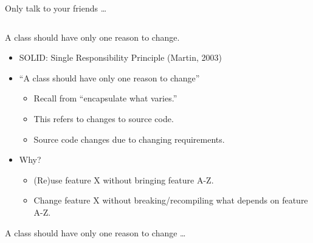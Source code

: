 \documentclass{beamer}
\begin{document}
\begin{frame}{Only talk to your friends \ldots}
    \vspace{0cm}
    \begin{columns}
        \column{\dimexpr\paperwidth-40pt}
        
    \end{columns}
\end{frame}

\begin{frame}{A class should have only one reason to change.}
    \begin{itemize}
        \item SOLID: Single Responsibility Principle (Martin, 2003)
        \item ``A class should have only one reason to change''
        \begin{itemize}
            \item Recall from ``encapsulate what varies.''
            \item This refers to changes to source code.
            \item Source code changes due to changing requirements.
        \end{itemize}
    \item Why? 
        \begin{itemize}
            \item (Re)use feature X without bringing feature A-Z.
            \item Change feature X without breaking/recompiling what depends on feature A-Z.
        \end{itemize}
    \end{itemize}
\end{frame}

\begin{frame}{A class should have only one reason to change \ldots}
    \vspace{0cm}
    \begin{columns}
        \column{\dimexpr\paperwidth-40pt}
        
    \end{columns}
\end{frame}
\end{document}
